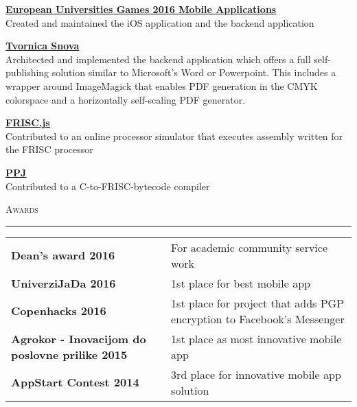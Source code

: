 \documentclass[10pt, a4paper, final, onecolumn, oneside, notitlepage]{article}
\newcommand{\sectionspacing}[0]{ \vspace{10pt} } %
\newcommand{\sectionrule}[0]{ \rule[6pt]{\textwidth}{0.5pt} } %
\renewcommand{\section}[1]{\sectionspacing {\large \scshape #1} \sectionrule}
\begin{document}
\begin{center}
\begin{flushleft}
\textbf{\href{https://itunes.apple.com/us/app/eug-2016/id1126963997?mt=8}{\underline{European Universities Games 2016 Mobile Applications}}} \\
Created and maintained the iOS application and the backend application \\
\vspace{2mm}

\textbf{\href{https://tvornica-snova.hr}{\underline{Tvornica Snova}}} \\
Architected and implemented the backend application which offers a full
self-publishing solution similar to Microsoft's Word or Powerpoint.
This includes a wrapper around ImageMagick that enables PDF generation in the
CMYK colorspace and a horizontally self-scaling PDF generator. \\
\vspace{2mm}

\textbf{\href{https://github.com/izuzak/FRISCjs}{\underline{FRISC.js}}} \\
Contributed to an online processor simulator that executes assembly written for
the FRISC processor \\
\vspace{2mm}

\textbf{\href{https://github.com/Stankec/PPJ}{\underline{PPJ}}} \\
Contributed to a C-to-FRISC-bytecode compiler \\
\end{flushleft}


\section{Awards}
\begin{tabular}{ >{\hfill}p{} p{} }
\textbf{Dean's award 2016} & For academic community service work \\
\textbf{UniverziJaDa 2016} & 1st place for best mobile app \\
\textbf{Copenhacks 2016} & 1st place for project that adds PGP encryption to
Facebook's Messenger \\
\textbf{Agrokor - Inovacijom do poslovne prilike 2015} & 1st place as most
innovative mobile app \\
\textbf{AppStart Contest 2014} & 3rd place for innovative mobile app solution \\
\end{tabular}



\end{center}
\end{document}
